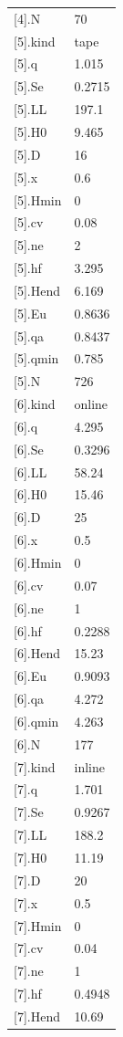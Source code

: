 {\begin{longtable}{p{}p{}}
{}[4].N & 70\\
{}[5].kind & tape\\
{}[5].q & 1.015\\
{}[5].Se & 0.2715\\
{}[5].LL & 197.1\\
{}[5].H0 & 9.465\\
{}[5].D & 16\\
{}[5].x & 0.6\\
{}[5].Hmin & 0\\
{}[5].cv & 0.08\\
{}[5].ne & 2\\
{}[5].hf & 3.295\\
{}[5].Hend & 6.169\\
{}[5].Eu & 0.8636\\
{}[5].qa & 0.8437\\
{}[5].qmin & 0.785\\
{}[5].N & 726\\
{}[6].kind & online\\
{}[6].q & 4.295\\
{}[6].Se & 0.3296\\
{}[6].LL & 58.24\\
{}[6].H0 & 15.46\\
{}[6].D & 25\\
{}[6].x & 0.5\\
{}[6].Hmin & 0\\
{}[6].cv & 0.07\\
{}[6].ne & 1\\
{}[6].hf & 0.2288\\
{}[6].Hend & 15.23\\
{}[6].Eu & 0.9093\\
{}[6].qa & 4.272\\
{}[6].qmin & 4.263\\
{}[6].N & 177\\
{}[7].kind & inline\\
{}[7].q & 1.701\\
{}[7].Se & 0.9267\\
{}[7].LL & 188.2\\
{}[7].H0 & 11.19\\
{}[7].D & 20\\
{}[7].x & 0.5\\
{}[7].Hmin & 0\\
{}[7].cv & 0.04\\
{}[7].ne & 1\\
{}[7].hf & 0.4948\\
{}[7].Hend & 10.69\\

\end{longtable}}
